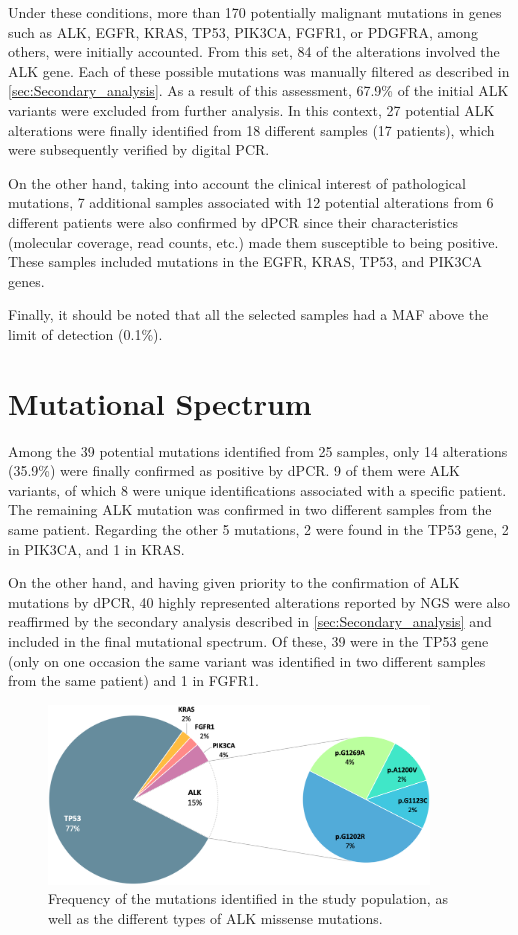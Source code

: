 Under these conditions, more than 170 potentially malignant mutations in genes such as ALK, EGFR, KRAS, TP53, PIK3CA, FGFR1, or PDGFRA, among others, were initially accounted. From this set, 84 of the alterations involved the ALK gene. Each of these possible mutations was manually filtered as described in \autoref{sec:Secondary_analysis}. As a result of this assessment, 67.9\% of the initial ALK variants were excluded from further analysis. In this context, 27 potential ALK alterations were finally identified from 18 different samples (17 patients), which were subsequently verified by digital PCR.

On the other hand, taking into account the clinical interest of pathological mutations, 7 additional samples associated with 12 potential alterations from 6 different patients were also confirmed by dPCR since their characteristics (molecular coverage, read counts, etc.) made them susceptible to being positive. These samples included mutations in the EGFR, KRAS, TP53, and PIK3CA genes.

Finally, it should be noted that all the selected samples had a MAF above the limit of detection (0.1\%).

\section{Mutational Spectrum}

Among the 39 potential mutations identified from 25 samples, only 14 alterations (35.9\%) were finally confirmed as positive by dPCR. 9 of them were ALK variants, of which 8 were unique identifications associated with a specific patient. The remaining ALK mutation was confirmed in two different samples from the same patient. Regarding the other 5 mutations, 2 were found in the TP53 gene, 2 in PIK3CA, and 1 in KRAS.

On the other hand, and having given priority to the confirmation of ALK mutations by dPCR, 40 highly represented alterations reported by NGS were also reaffirmed by the secondary analysis described in \autoref{sec:Secondary_analysis} and included in the final mutational spectrum. Of these, 39 were in the TP53 gene (only on one occasion the same variant was identified in two different samples from the same patient) and 1 in FGFR1.

\begin{figure}[ht]
    \centering
    \includegraphics[width=0.9\textwidth]{Images/chapter_4/all_mutations.png}
    \caption{Frequency of the mutations identified in the study population, as well as the different types of ALK missense mutations.}
    \label{fig:All_mutations}
\end{figure}

